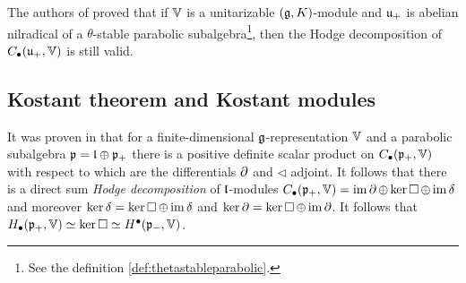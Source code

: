 The authors of \cite{huang_dirac_2006} proved that if $\mathbb{V}$ is a unitarizable $(\mathfrak{g},K)$-module and $\mathfrak{u}_+$ is abelian nilradical of a $\theta$-stable parabolic subalgebra\footnote{See the definition \ref{def:thetastableparabolic}.}, then the Hodge decomposition of $C_\bullet(\mathfrak{u}_+,\mathbb{V})$ is still valid. 

\subsection{Kostant theorem and Kostant modules}



It was proven in \cite{kostant_lie_1961} that for a finite-dimensional $\mathfrak{g}$-representation $\mathbb{V}$ and a parabolic subalgebra $\mathfrak{p} = \mathfrak{l} \oplus \mathfrak{p}_+$ there is a positive definite scalar product on $C_\bullet(\mathfrak{p}_+,\mathbb{V})$ with respect to which are the differentials $\operatorname{\partial}$ and $\lhd$ adjoint. It follows that there is a direct sum \emph{Hodge decomposition} of $\mathfrak{l}$-modules $C_\bullet(\mathfrak{p}_+,\mathbb{V})=\operatorname{\mathrm{im}} \operatorname{\partial} \oplus  \ker \operatorname{\square} \oplus \operatorname{\mathrm{im}} \operatorname{\delta}$ and moreover $\ker \operatorname{\delta} = \ker \operatorname{\square} \oplus \operatorname{\mathrm{im}} \operatorname{\delta}$ and $\ker \operatorname{\partial} = \ker \operatorname{\square} \oplus \operatorname{\mathrm{im}} \operatorname{\partial}$. It follows that $H_\bullet(\mathfrak{p}_+,\mathbb{V})\simeq \ker \operatorname{\square} \simeq H^\bullet(\mathfrak{p}_-,\mathbb{V})$.

